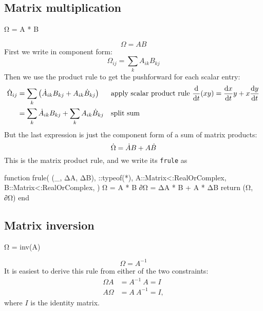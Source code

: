 \documentclass[../../main.tex]{subfiles}
\begin{document}
\begin{refsection}
\subsection{Matrix multiplication}\label{matrix-multiplication}
\begin{juliacode}
Ω = A * B
\end{juliacode}
\[\Omega = A B\]
First we write in component form:
\[\Omega_{ij} = \sum_k A_{ik} B_{kj}\]
Then we use the product rule to get the pushforward for each scalar entry:
\begin{align*}
	\dot{\Omega}_{ij}
	 & = \sum_k \left( \dot{A}_{ik} B_{kj} + A_{ik} \dot{B}_{kj} \right)
	 &                                                                     & \text{apply scalar product rule }
	\dv{t}(x y) = \dv{x}{t} y + x \dv{y}{t}                                                                    \\
	 & = \sum_k \dot{A}_{ik} B_{kj} + \sum_k A_{ik} \dot{B}_{kj}
	 &                                                                     & \text{split sum}
\end{align*}
But the last expression is just the component form of a sum of matrix products:
\begin{equation}\label{diffprod}
	\dot{\Omega} = \dot{A} B + A \dot{B}
\end{equation}
This is the matrix product rule, and we write its \texttt{frule} as
\begin{juliacode}
function frule(
    (_, ΔA, ΔB),
    ::typeof(*),
    A::Matrix{<:RealOrComplex},
    B::Matrix{<:RealOrComplex},
)
    Ω = A * B
    ∂Ω = ΔA * B + A * ΔB
    return (Ω, ∂Ω)
end
\end{juliacode}
\subsection{Matrix inversion}\label{matrix-inversion}
\begin{juliacode}
Ω = inv(A)
\end{juliacode}
\[\Omega = A^{-1}\]
It is easiest to derive this rule from either of the two constraints:
\begin{align*}
	\Omega A & = A^{-1} ~A = I  \\
	A \Omega & = A~ A^{-1} = I,
\end{align*}
where $I$ is the identity matrix.


\end{refsection}
\end{document}
